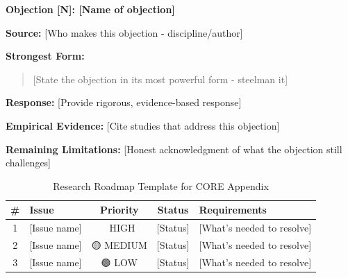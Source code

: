 \begin{tcolorbox}[colback=yellow!5!white, colframe=yellow!75!black, 
    title=Critical Foundation Template]

\textbf{Objection [N]: [Name of objection]}

\textbf{Source:} [Who makes this objection - discipline/author]

\textbf{Strongest Form:}
\begin{quote}
[State the objection in its most powerful form - steelman it]
\end{quote}

\textbf{Response:}
[Provide rigorous, evidence-based response]

\textbf{Empirical Evidence:}
[Cite studies that address this objection]

\textbf{Remaining Limitations:}
[Honest acknowledgment of what the objection still challenges]

\end{tcolorbox}



\begin{table}[htbp]
\centering
\caption{Research Roadmap Template for CORE Appendix}
\renewcommand{\arraystretch}{1.3}
\begin{tabular}{@{}clccl@{}}
\toprule
\textbf{\#} & \textbf{Issue} & \textbf{Priority} & \textbf{Status} & \textbf{Requirements} \\
\midrule
1 & [Issue name] & 🔴 HIGH & [Status] & [What's needed to resolve] \\
2 & [Issue name] & 🟡 MEDIUM & [Status] & [What's needed to resolve] \\
3 & [Issue name] & 🟢 LOW & [Status] & [What's needed to resolve] \\
\bottomrule
\end{tabular}
\end{table}


